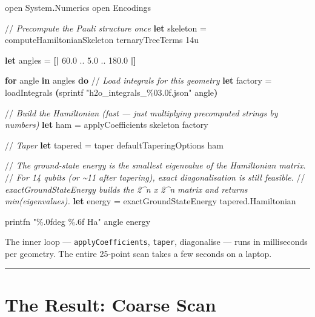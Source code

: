 \documentclass[
  11pt,
  oneside]{book}
\newenvironment{Shaded}{\begin{snugshade}}{\end{snugshade}}
\newcommand{\CommentTok}[1]{\textcolor[rgb]{0.56,0.35,0.01}{\textit{#1}}}
\newcommand{\DecValTok}[1]{\textcolor[rgb]{0.00,0.00,0.81}{#1}}
\newcommand{\FloatTok}[1]{\textcolor[rgb]{0.00,0.00,0.81}{#1}}
\newcommand{\KeywordTok}[1]{\textcolor[rgb]{0.13,0.29,0.53}{\textbf{#1}}}
\newcommand{\NormalTok}[1]{#1}
\newcommand{\OperatorTok}[1]{\textcolor[rgb]{0.81,0.36,0.00}{\textbf{#1}}}
\newcommand{\OtherTok}[1]{\textcolor[rgb]{0.56,0.35,0.01}{#1}}
\newcommand{\StringTok}[1]{\textcolor[rgb]{0.31,0.60,0.02}{#1}}
\begin{document}
\begin{Shaded}
\begin{Highlighting}[]
\OtherTok{open}\NormalTok{ System}\KeywordTok{.}\NormalTok{Numerics}
\OtherTok{open}\NormalTok{ Encodings}

\NormalTok{//}\CommentTok{ Precompute the Pauli structure once}
\KeywordTok{let}\NormalTok{ skeleton = computeHamiltonianSkeleton ternaryTreeTerms }\DecValTok{14}\NormalTok{u}

\KeywordTok{let}\NormalTok{ angles = }\OperatorTok{[|} \FloatTok{60.0}\NormalTok{ .. }\FloatTok{5.0}\NormalTok{ .. }\FloatTok{180.0} \OperatorTok{|]}

\KeywordTok{for}\NormalTok{ angle }\KeywordTok{in}\NormalTok{ angles }\KeywordTok{do}
\NormalTok{    //}\CommentTok{ Load integrals for this geometry}
    \KeywordTok{let}\NormalTok{ factory = loadIntegrals }\OperatorTok{(}\NormalTok{sprintf }\StringTok{"h2o\_integrals\_\%03.0f.json"}\NormalTok{ angle}\OperatorTok{)}

\NormalTok{    //}\CommentTok{ Build the Hamiltonian (fast --- just multiplying precomputed strings by numbers)}
    \KeywordTok{let}\NormalTok{ ham = applyCoefficients skeleton factory}

\NormalTok{    //}\CommentTok{ Taper}
    \KeywordTok{let}\NormalTok{ tapered = taper defaultTaperingOptions ham}

\NormalTok{    //}\CommentTok{ The ground{-}state energy is the smallest eigenvalue of the Hamiltonian matrix.}
\NormalTok{    //}\CommentTok{ For 14 qubits (or \textasciitilde{}11 after tapering), exact diagonalisation is still feasible.}
\NormalTok{    //}\CommentTok{ exactGroundStateEnergy builds the 2\^{}n x 2\^{}n matrix and returns min(eigenvalues).}
    \KeywordTok{let}\NormalTok{ energy = exactGroundStateEnergy tapered.Hamiltonian}

\NormalTok{    printfn }\StringTok{"\%.0fdeg  \%.6f Ha"}\NormalTok{ angle energy}
\end{Highlighting}
\end{Shaded}

The inner loop --- \texttt{applyCoefficients}, \texttt{taper},
diagonalise --- runs in milliseconds per geometry. The entire 25-point
scan takes a few seconds on a laptop.

\begin{center}\rule{0.5\linewidth}{0.5pt}\end{center}

\section{The Result: Coarse Scan}\label{the-result-coarse-scan}
\end{document}
